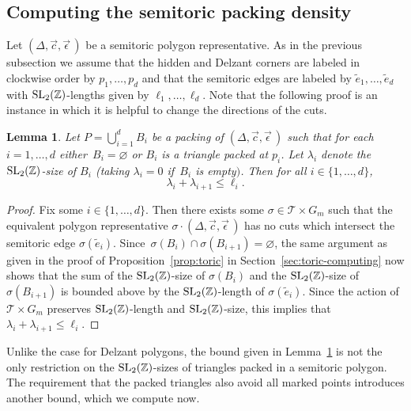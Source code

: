 \documentclass[10pt,a4paper]{amsart}
\numberwithin{equation}{section}
\newtheorem{Lemma}[Theorem]{Lemma}
\def\Z{{\mathbb Z}}
\newcommand{\De}{\Delta}
\newcommand{\SL}{{\rm SL}_2(\Z)}
\newcommand{\strep}{(\De,\vec{c},\vec{\epsilon}\,)}
\theoremstyle{definition}
\theoremstyle{plain}
\theoremstyle{plain}
\begin{document}
\subsection{Computing the semitoric packing density}
\label{sec:semitoric-compute}

Let $\strep$ be a semitoric polygon representative. As in the previous subsection we assume that the hidden and Delzant corners are labeled in clockwise order by $p_1,\ldots,p_d$ and that the semitoric edges are labeled by $\tilde{e}_1,\ldots,\tilde{e}_d$ with $\SL$-lengths given by $\ell_1,\ldots,\ell_d$.
Note that the following proof is an instance in which it is helpful to change the directions of the cuts.

\begin{Lemma}\label{lem:st-firstbound}
 Let $P = \bigcup_{i=1}^d B_i$ be a packing of $\strep$ such that for each $i=1,\ldots, d$ either~${B_i=\varnothing}$ or $B_i$ is a triangle packed at $p_i$. Let $\lambda_i$ denote the $\SL$-size of $B_i$ {\rm (}taking $\lambda_i=0$ if~$B_i$ is empty$)$. Then for all $i\in\{1,\ldots,d\}$,
 \[
 \lambda_i + \lambda_{i+1}\leq \ell_i.
 \]
\end{Lemma}

\begin{proof}
Fix some $i\in\{1,\ldots,d\}$. Then there exists some $\sigma\in\mathcal{T}\times G_m$ such that the equivalent polygon representative $\sigma\cdot\strep$ has no cuts which intersect the semitoric edge $\sigma(\tilde{e}_i)$.
Since~$\sigma(B_i)\cap \sigma(B_{i+1}) = \varnothing$, the same argument as given in the proof of Proposition~\ref{prop:toric} in Section~\ref{sec:toric-computing} now shows that the sum of the $\SL$-size of $\sigma(B_i)$ and the $\SL$-size of $\sigma(B_{i+1})$ is bounded above by the $\SL$-length of $\sigma(\tilde{e}_i)$. Since the action of $\mathcal{T}\times G_m$ preserves $\SL$-length and $\SL$-size, this implies that $\lambda_i+\lambda_{i+1}\leq \ell_i$.
\end{proof}



Unlike the case for Delzant polygons, the bound given in Lemma~\ref{lem:st-firstbound} is not the only restriction on the $\SL$-sizes of triangles packed in a semitoric polygon. The requirement that the packed triangles also avoid all marked points introduces another bound, which we compute now.
\end{document}
